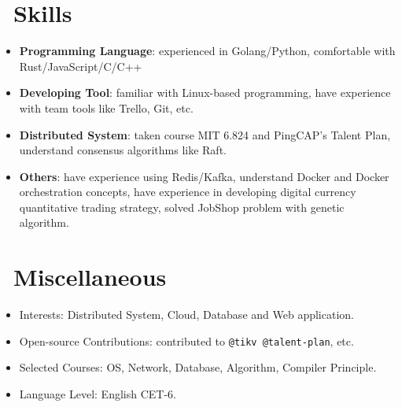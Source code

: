 \documentclass{resume}
\newcommand{\en}[1]{#1}
\newcommand{\zh}[1]{}
\begin{document}
\section{\faCogs\ \en{Skills}\zh{技能}}
\begin{itemize}[parsep=0.25ex]
      \item \en{\textbf{Programming Language}:
                  experienced in Golang/Python, 
                  comfortable with Rust/JavaScript/C/C++}
            \zh{\textbf{编程语言}:
                  熟悉 Golang/Python，
                  了解 Rust/JavaScript/C/C++ 等}

      \item \en{\textbf{Developing Tool}:
                  familiar with Linux-based programming,
                  have experience with team tools like Trello, Git, etc.}
            \zh{\textbf{开发工具}:
                  熟悉 Linux，有 Trello、Git 等团队合作工具的使用经验}

      \item \en{\textbf{Distributed System}:
                  taken course MIT 6.824 and PingCAP's Talent Plan,
                  understand consensus algorithms like Raft.}
            \zh{\textbf{分布式系统}:
                  自主学习了 MIT 6.824 和 PingCAP's Talent Plan 课程，
                  了解 Raft 算法}

      \item \en{\textbf{Others}:
                  have experience using Redis/Kafka, 
                  understand Docker and Docker orchestration concepts, 
                  have experience in developing digital currency quantitative trading strategy, 
                  solved JobShop problem with genetic algorithm.}
            \zh{\textbf{其它}:
                  有 Redis/Kafka 使用经验，了解容器及容器编排相关概念，
                  开发过数字货币量化交易策略，使用遗传算法解决过 JobShop 问题}
\end{itemize}

\section{\faInfo\ \en{Miscellaneous}\zh{杂项}}
\begin{itemize}[parsep=0.25ex]
      \item \en{Interests: Distributed System, Cloud, Database and Web application.}
            \zh{兴趣：分布式系统、云、数据库、Web 应用等}
      \item \en{Open-source Contributions: contributed to \texttt{@tikv @talent-plan}, etc.}
            \zh{开源贡献: 为 \texttt{@tikv @talent-plan} 等项目组织贡献过代码}
      \item \en{Selected Courses: OS, Network, Database, Algorithm, Compiler Principle.}
            \zh{主修课程：操作系统、计算机网络、数据库系统原理、算法设计与分析、编译原理}
      \item \en{Language Level: English CET-6.}
            \zh{语言水平：英语 CET-6}
\end{itemize}
\end{document}
